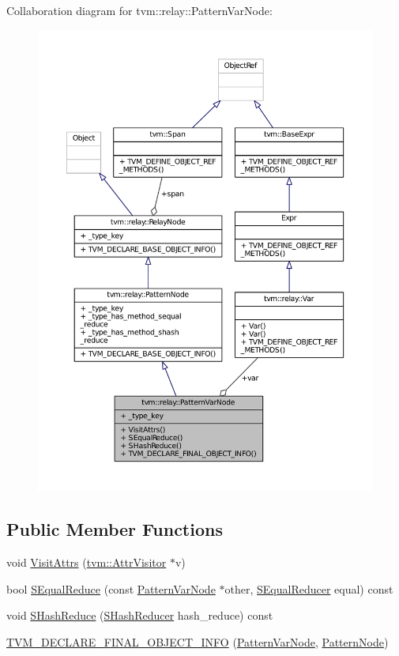 Collaboration diagram for tvm\+:\+:relay\+:\+:Pattern\+Var\+Node\+:
\nopagebreak
\begin{figure}[H]
\begin{center}
\leavevmode
\includegraphics[width=350pt]{classtvm_1_1relay_1_1PatternVarNode__coll__graph}
\end{center}
\end{figure}
\subsection*{Public Member Functions}
\begin{DoxyCompactItemize}
\item 
void \hyperlink{classtvm_1_1relay_1_1PatternVarNode_a708bf5e7f6d95a62eab6838c17563f69}{Visit\+Attrs} (\hyperlink{classtvm_1_1AttrVisitor}{tvm\+::\+Attr\+Visitor} $\ast$v)
\item 
bool \hyperlink{classtvm_1_1relay_1_1PatternVarNode_a0afaea9c9d6042bfdf83d8d587c92aeb}{S\+Equal\+Reduce} (const \hyperlink{classtvm_1_1relay_1_1PatternVarNode}{Pattern\+Var\+Node} $\ast$other, \hyperlink{classtvm_1_1SEqualReducer}{S\+Equal\+Reducer} equal) const 
\item 
void \hyperlink{classtvm_1_1relay_1_1PatternVarNode_a4d3bf648a1ed93a50d6a3c96b56e8d05}{S\+Hash\+Reduce} (\hyperlink{classtvm_1_1SHashReducer}{S\+Hash\+Reducer} hash\+\_\+reduce) const 
\item 
\hyperlink{classtvm_1_1relay_1_1PatternVarNode_a93383c5d70c0fd17b53c0b6a27a8c307}{T\+V\+M\+\_\+\+D\+E\+C\+L\+A\+R\+E\+\_\+\+F\+I\+N\+A\+L\+\_\+\+O\+B\+J\+E\+C\+T\+\_\+\+I\+N\+FO} (\hyperlink{classtvm_1_1relay_1_1PatternVarNode}{Pattern\+Var\+Node}, \hyperlink{classtvm_1_1relay_1_1PatternNode}{Pattern\+Node})
\end{DoxyCompactItemize}
